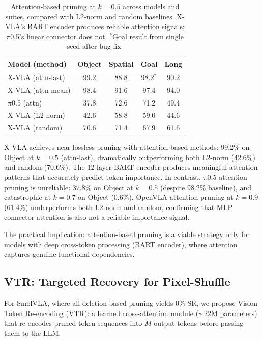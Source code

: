 \documentclass[10pt,twocolumn]{article}
\begin{document}
\begin{table}[t]
\centering
\caption{Attention-based pruning at $k\!=\!0.5$ across models and suites, compared with L2-norm and random baselines. X-VLA's BART encoder produces reliable attention signals; $\pi$0.5's linear connector does not. $^*$Goal result from single seed after bug fix.}
\label{tab:attention}
\small
\begin{tabular}{@{}lcccc@{}}
\toprule
Model (method) & Object & Spatial & Goal & Long \\
\midrule
X-VLA (attn-last) & 99.2 & 88.8 & 98.2$^*$ & 90.2 \\
X-VLA (attn-mean) & 98.4 & 91.6 & 97.4 & 94.0 \\
$\pi$0.5 (attn) & 37.8 & 72.6 & 71.2 & 49.4 \\
\midrule
X-VLA (L2-norm) & 42.6 & 58.8 & 59.0 & 44.6 \\
X-VLA (random) & 70.6 & 71.4 & 67.9 & 61.6 \\
\bottomrule
\end{tabular}
\end{table}

X-VLA achieves near-lossless pruning with attention-based methods: 99.2\% on Object at $k\!=\!0.5$ (attn-last), dramatically outperforming both L2-norm (42.6\%) and random (70.6\%).
The 12-layer BART encoder produces meaningful attention patterns that accurately predict token importance.
In contrast, $\pi$0.5 attention pruning is unreliable: 37.8\% on Object at $k\!=\!0.5$ (despite 98.2\% baseline), and catastrophic at $k\!=\!0.7$ on Object (0.6\%).
OpenVLA attention pruning at $k\!=\!0.9$ (61.4\%) underperforms both L2-norm and random, confirming that MLP connector attention is also not a reliable importance signal.

The practical implication: attention-based pruning is a viable strategy only for models with deep cross-token processing (BART encoder), where attention captures genuine functional dependencies.

\subsection{VTR: Targeted Recovery for Pixel-Shuffle}
\label{sec:vtr}

For SmolVLA, where all deletion-based pruning yields 0\% SR, we propose Vision Token Re-encoding (VTR): a learned cross-attention module (${\sim}$22M parameters) that re-encodes pruned token sequences into $M$ output tokens before passing them to the LLM.
\end{document}
